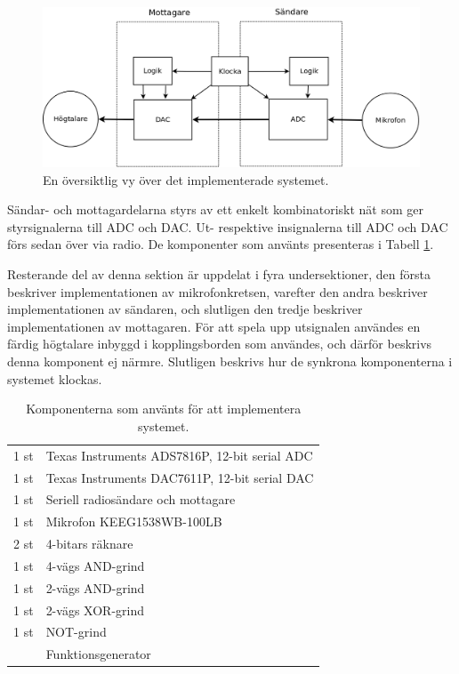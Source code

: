 \documentclass[a4paper,10pt]{article}
\begin{document}
\begin{figure}[h]
    \centering
    \includegraphics[width=\textwidth]{sysoversikt.png}
    \caption{En översiktlig vy över det implementerade systemet.}
    \label{fig:sysoversikt}
\end{figure}

Sändar- och mottagardelarna styrs av ett enkelt kombinatoriskt nät som ger 
styrsignalerna till ADC och DAC. Ut- respektive insignalerna till ADC och DAC
förs sedan över via radio. De komponenter som använts presenteras i Tabell 
\ref{tab:komponenter}. 

Resterande del av denna sektion är uppdelat i fyra
undersektioner, den första beskriver implementationen av mikrofonkretsen, 
varefter den andra beskriver implementationen av sändaren, och slutligen den 
tredje beskriver implementationen av mottagaren. För att spela upp
utsignalen användes en färdig högtalare inbyggd i kopplingsborden som användes,
och därför beskrivs denna komponent ej närmre. Slutligen beskrivs hur de 
synkrona komponenterna i systemet klockas.


\begin{table}[h]
    \centering
    \begin{tabular}{|l|l|}
    \hline
    1 st & Texas Instruments ADS7816P, 12-bit serial ADC \\
    1 st & Texas Instruments DAC7611P, 12-bit serial DAC \\
    1 st & Seriell radiosändare och mottagare \\
    1 st & Mikrofon KEEG1538WB-100LB \\
    2 st & 4-bitars räknare \\
    1 st & 4-vägs AND-grind\\
    1 st & 2-vägs AND-grind \\
    1 st & 2-vägs XOR-grind \\
    1 st & NOT-grind \\
	 & Funktionsgenerator \\
    \hline
    \end{tabular}
    
    \caption{Komponenterna som använts för att implementera systemet.}
    \label{tab:komponenter}

\end{table}
\end{document}
